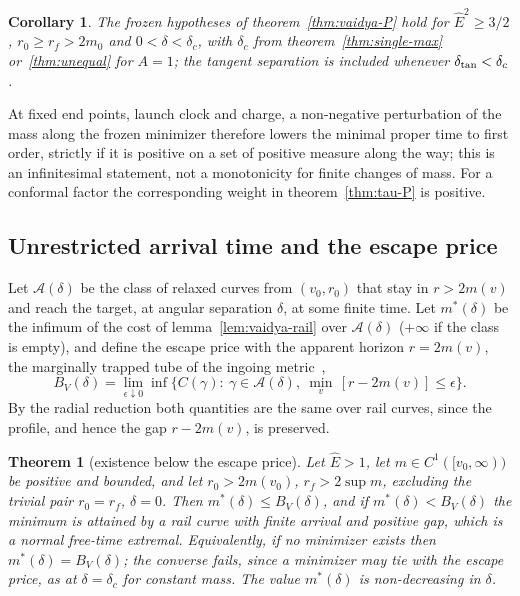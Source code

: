 \documentclass[aip,jmp,amsmath,amssymb,reprint]{revtex4-2}
\newcommand{\Ehat}{\hat E}
\theoremstyle{plain}
\newtheorem{theorem}{Theorem}
\newtheorem{corollary}[proposition]{Corollary}
\theoremstyle{definition}
\begin{document}
\begin{corollary}\label{cor:vaidya-P}
The frozen hypotheses of theorem~\ref{thm:vaidya-P} hold for $\Ehat^2\ge3/2$, $r_0\ge r_f>2m_0$ and
$0<\delta<\delta_c$, with $\delta_c$ from theorem~\ref{thm:single-max} or~\ref{thm:unequal} for $A=1$;
the tangent separation is included whenever $\delta_{\rm tan}<\delta_c$.
\end{corollary}

At fixed end points, launch clock and charge, a non-negative perturbation of the mass along
the frozen minimizer therefore lowers the minimal proper time to first order, strictly if it
is positive on a set of positive measure along the way; this is an infinitesimal statement,
not a monotonicity for finite changes of mass. For a conformal factor the corresponding
weight in theorem~\ref{thm:tau-P} is positive.

\subsection{Unrestricted arrival time and the escape price}
\label{sec:vaidya-escape}
Let $\mathcal A(\delta)$ be the class of relaxed curves from $(v_0,r_0)$ that stay in $r>2m(v)$
and reach the target, at angular separation $\delta$, at some finite time. Let $m^*(\delta)$ be the
infimum of the cost of lemma~\ref{lem:vaidya-rail} over $\mathcal A(\delta)$ ($+\infty$ if the class
is empty), and define the escape price with the apparent horizon $r=2m(v)$, the marginally trapped
tube of the ingoing metric~\cite{Hayward1996,AshtekarKrishnan2003,Booth2005},
\[
  B_V(\delta)=\lim_{\epsilon\downarrow0}\inf\Big\{C(\gamma):\ \gamma\in\mathcal A(\delta),\
  \min_v\,[r-2m(v)]\le\epsilon\Big\}.
\]
By the radial reduction both quantities are the same over rail curves, since the profile,
and hence the gap $r-2m(v)$, is preserved.

\begin{theorem}[existence below the escape price]\label{thm:vaidya-exist-inf}
Let $\Ehat>1$, let $m\in C^1([v_0,\infty))$ be positive and bounded, and let $r_0>2m(v_0)$,
$r_f>2\sup m$, excluding the trivial pair $r_0=r_f$, $\delta=0$. Then $m^*(\delta)\le B_V(\delta)$, and if
$m^*(\delta)<B_V(\delta)$ the minimum is attained by a rail curve with finite arrival and positive
gap, which is a normal free-time extremal. Equivalently, if no minimizer exists then
$m^*(\delta)=B_V(\delta)$; the converse fails, since a minimizer may tie with the escape price, as
at $\delta=\delta_c$ for constant mass. The value $m^*(\delta)$ is non-decreasing in $\delta$.
\end{theorem}
\end{document}
